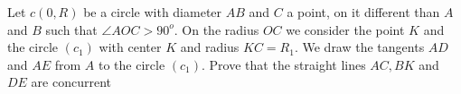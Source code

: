 Let $c(0, R)$ be a circle with diameter $AB$ and $C$ a point, on it different than $A$ and $B$ such that  $\angle AOC > 90^o$. On the radius $OC$ we consider the point $K$ and the circle $(c_1)$  with center $K$ and radius $KC = R_1$. We draw the tangents $AD$ and $AE$ from $A$ to the circle $(c_1)$. Prove that the straight lines $AC, BK$ and $DE$ are concurrent
